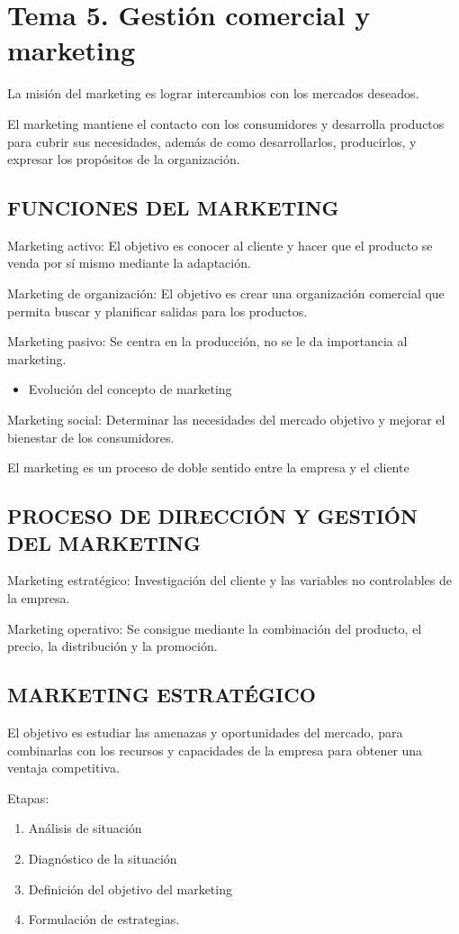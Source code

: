 \documentclass[12pt, twoside, openright]{report} %
\begin{document}
\chapter{Tema 5. Gestión comercial y marketing}
La misión del marketing es lograr intercambios con los mercados deseados.

El marketing mantiene el contacto con los consumidores y desarrolla productos para cubrir sus necesidades, además de como desarrollarlos, producirlos, y expresar los propósitos de la organización.

\section{FUNCIONES DEL MARKETING}
Marketing activo: El objetivo es conocer al cliente y hacer que el producto se venda por sí mismo mediante la adaptación.

Marketing de organización: El objetivo es crear una organización comercial que permita buscar y planificar salidas para los productos.

Marketing pasivo: Se centra en la producción, no se le da importancia al marketing.
\begin{itemize}
	\item Evolución del concepto de marketing
\end{itemize}

Marketing social: Determinar las necesidades del mercado objetivo y mejorar el bienestar de los consumidores.

El marketing es un proceso de doble sentido entre la empresa y el cliente

\section{PROCESO DE DIRECCIÓN Y GESTIÓN DEL MARKETING}
Marketing estratégico: Investigación del cliente y las variables no controlables de la empresa.

Marketing operativo: Se consigue mediante la combinación del producto, el precio, la distribución y la promoción.

\section{MARKETING ESTRATÉGICO}
El objetivo es estudiar las amenazas y oportunidades del mercado, para combinarlas con los recursos y capacidades de la empresa para obtener una ventaja competitiva.
\pagebreak

Etapas:
\begin{enumerate}
	\item Análisis de situación
	\item Diagnóstico de la situación
	\item Definición del objetivo del marketing
	\item Formulación de estrategias.
\end{enumerate}
\end{document}
